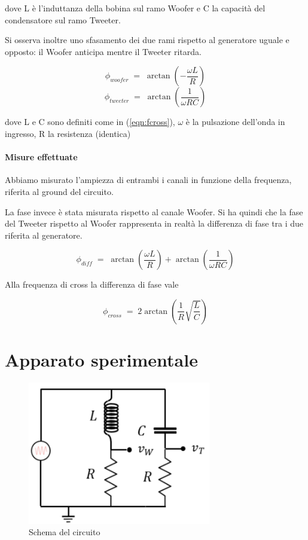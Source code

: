 \documentclass[12pt,a4paper]{article}
\begin{document}
dove L è l'induttanza della bobina sul ramo Woofer e C la capacità del condensatore sul ramo Tweeter.

Si osserva inoltre uno sfasamento dei due rami rispetto al generatore uguale e opposto: il Woofer anticipa mentre il Tweeter ritarda. 

\begin{equation}
\label{eqn:p_woofer}
\phi_{woofer} \; = \; \arctan(-\frac{\omega L}{R})
\end{equation}
\begin{equation}
\label{eqn:p_tweeter}
\phi_{tweeter} \; = \; \arctan(\frac{1}{\omega RC})
\end{equation}

dove L e C sono definiti come in (\ref{eqn:fcross}), $\omega$ è la pulsazione dell'onda in ingresso, R la resistenza (identica)

\paragraph{Misure effettuate}
Abbiamo misurato l'ampiezza di entrambi i canali in funzione della frequenza, riferita al ground del circuito. 

La fase invece è stata misurata rispetto al canale Woofer. Si ha quindi che la fase del Tweeter rispetto al Woofer rappresenta in realtà la differenza di fase tra i due riferita al generatore.

\begin{equation}
\label{eqn: p_diff}
\phi_{diff} \; = \; \arctan(\frac{\omega L}{R}) + \arctan(\frac{1}{\omega RC})
\end{equation}

Alla frequenza di cross la differenza di fase vale

\begin{equation}
\label{eqn: pdiff_CROSS}
\phi_{cross} \; = \; 2 \arctan(\frac{1}{R} \sqrt{\frac{L}{C}})
\end{equation}

\section{Apparato sperimentale}

\begin{figure}[H]
\centering
\includegraphics[width=8cm]{crossover_scheme.png}

\caption{Schema del circuito}
\label{Fig1}

\end{figure}
\end{document}
